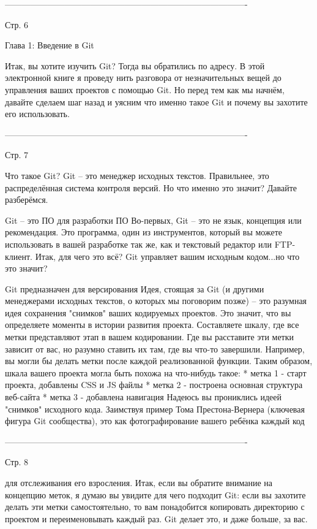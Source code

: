 -------------------------------------------------------------------------------------

Стр. 6

Глава 1: Введение в Git

Итак, вы хотите изучить Git? Тогда вы обратились по адресу. В этой электронной книге
я проведу нить разговора от незначительных вещей до управления ваших проектов с
помощью Git. Но перед тем как мы начнём, давайте сделаем шаг назад и уясним что
именно такое Git и почему вы захотите его использовать.

-------------------------------------------------------------------------------------

Стр. 7

Что такое Git?
Git -- это менеджер исходных текстов. Правильнее, это распределённая система
контроля версий. Но что именно это значит? Давайте разберёмся.

Git -- это ПО для разработки ПО
Во-первых, Git -- это не язык, концепция или рекомендация. Это программа, один из
инструментов, который вы можете использовать в вашей разработке так же, как и 
текстовый редактор или FTP-клиент. Итак, для чего это всё? Git управляет вашим 
исходным кодом...но что это значит?

Git предназначен для версирования
Идея, стоящая за Git (и другими менеджерами исходных текстов, о которых мы поговорим
позже) -- это разумная идея сохранения "снимков" ваших кодируемых проектов. Это 
значит, что вы определяете моменты в истории развития проекта. Составляете шкалу,
где все метки представляют этап в вашем кодировании. Где вы расставите эти метки
зависит от вас, но разумно ставить их там, где вы что-то завершили. Например, вы
могли бы делать метки после каждой реализованной функции. Таким образом, шкала
вашего проекта могла быть похожа на что-нибудь такое:
	* метка 1 - старт проекта, добавлены CSS и JS файлы
	* метка 2 - построена основная структура веб-сайта
	* метка 3 - добавлена навигация
Надеюсь вы прониклись идеей "снимков" исходного кода. Заимствуя пример Тома
Престона-Вернера (ключевая фигура Git сообщества), это как фотографирование вашего
ребёнка каждый код 

-------------------------------------------------------------------------------------

Стр. 8

для отслеживания его взросления. Итак, если вы обратите внимание
на концепцию меток, я думаю вы увидите для чего подходит Git: если вы захотите делать
эти метки самостоятельно, то вам понадобится копировать директорию с проектом и
переименовывать каждый раз. Git делает это, и даже больше, за вас.